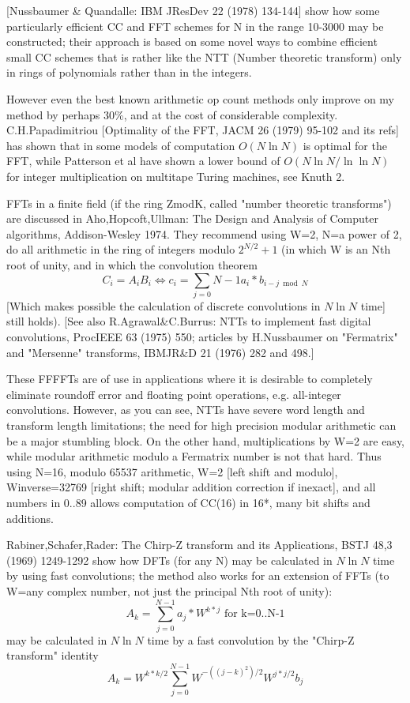 [Nussbaumer \& Quandalle: IBM JResDev 22 (1978) 134-144] show how some
particularly efficient CC and FFT schemes for N in the range 10-3000
may be constructed; their approach is based on some novel ways to combine
efficient small CC schemes that is rather like the NTT (Number theoretic
transform) only in rings of polynomials rather than in the integers.

However even the best known arithmetic op count methods only improve on my
method by perhaps 30\%, and at the cost of considerable complexity.
C.H.Papadimitriou [Optimality of the FFT, JACM 26 (1979) 95-102 and its refs]
has shown that in some models of computation $O(N\ln N)$ is
optimal for the FFT, while Patterson et al have shown a lower
bound of $O(N\ln N/\ln \ln N)$ for integer multiplication on multitape
Turing machines, see Knuth 2.

FFTs in a finite field (if the ring ZmodK, called "number theoretic
transforms") are discussed in Aho,Hopcoft,Ullman: The Design and Analysis
of Computer algorithms, Addison-Wesley 1974. They recommend using W=2,
N=a power of 2, do all arithmetic in the ring of integers 
modulo $2^{N/2}+1$
(in which W is an Nth root of unity, and in which the convolution theorem
\begin{equation}
    C_i=A_iB_i  \Longleftrightarrow   
         c_i = \sum_{j=0}{N-1} a_i*b_{i-j \bmod N}
\end{equation}
[Which makes possible the calculation of discrete convolutions in $N\ln N$ time]
still holds). [See also R.Agrawal\&C.Burrus: NTTs to implement fast digital
convolutions, ProcIEEE 63 (1975) 550; articles by H.Nussbaumer on "Fermatrix"
and "Mersenne" transforms, IBMJR\&D 21 (1976) 282 and 498.]

These FFFFTs are of use in applications where it is desirable
to completely eliminate roundoff error and floating point operations,
e.g. all-integer convolutions. However, as you can see, NTTs have severe
word length and transform length limitations; the need for high precision
modular arithmetic can be a major stumbling block. On the other hand,
multiplications by W=2 are easy, while modular arithmetic modulo a
Fermatrix number is not that hard. Thus using N=16, modulo 65537 arithmetic,
W=2 [left shift and modulo], Winverse=32769 [right shift; modular
addition correction if inexact], and all numbers in 0..89 allows
computation of CC(16) in 16*, many bit shifts and additions.

Rabiner,Schafer,Rader: The Chirp-Z transform and its Applications,
BSTJ 48,3 (1969) 1249-1292 show how DFTs (for any N) may be calculated in
$N\ln N$ time by using fast convolutions; the method also works for an extension
of FFTs (to W=any complex number, not just the principal Nth root of unity):
\begin{equation}
    A_k  =  \sum_{j=0}^{N-1}a_j*W^{k*j}  \mbox{ for k=0..N-1}
\end{equation}
may be calculated in $N\ln N$ time by a fast convolution by the "Chirp-Z
transform" identity
\begin{equation}
    A_k  = W^{k*k/2} \sum_{j=0}^{N-1} W^{-((j-k)^2)/2} W^{j*j/2}b_j
\end{equation}

